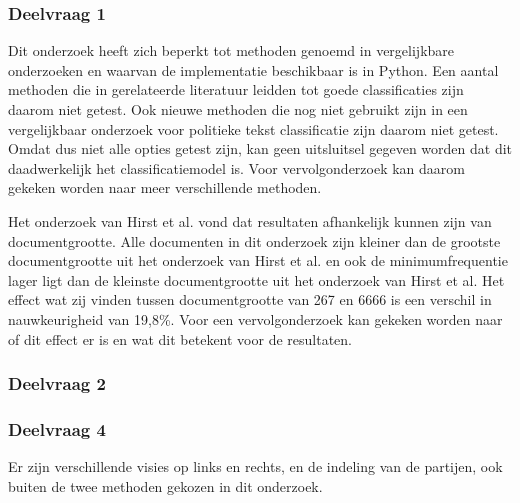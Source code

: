 \subsubsection{Deelvraag 1}
Dit onderzoek heeft zich beperkt tot methoden genoemd in vergelijkbare onderzoeken en waarvan de implementatie beschikbaar is in Python. Een aantal methoden die in gerelateerde literatuur leidden tot goede classificaties zijn daarom niet getest. Ook nieuwe methoden die nog niet gebruikt zijn in een vergelijkbaar onderzoek voor politieke tekst classificatie zijn daarom niet getest. Omdat dus niet alle opties getest zijn, kan geen uitsluitsel gegeven worden dat dit daadwerkelijk het classificatiemodel is. Voor vervolgonderzoek kan daarom gekeken worden naar meer verschillende methoden.\par
Het onderzoek van Hirst et al. vond dat resultaten afhankelijk kunnen zijn van documentgrootte. Alle documenten in dit onderzoek zijn kleiner dan de grootste documentgrootte uit het onderzoek van Hirst et al. en ook de minimumfrequentie lager ligt dan de kleinste documentgrootte uit het onderzoek van Hirst et al.
Het effect wat zij vinden tussen documentgrootte van 267 en 6666 is een verschil in nauwkeurigheid van 19,8\%. Voor een vervolgonderzoek kan gekeken worden naar of dit effect er is en wat dit betekent voor de resultaten.\par

\subsubsection{Deelvraag 2}


\subsubsection{Deelvraag 4}
Er zijn verschillende visies op links en rechts, en de indeling van de partijen, ook buiten de twee methoden gekozen in dit onderzoek.\par